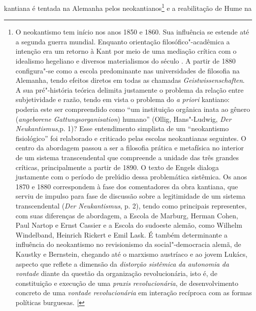 kantiana é tentada na Alemanha pelos neokantianos\footnote{O
  neokantismo tem início nos anos 1850 e 1860. Sua influência se estende
  até a segunda guerra mundial. Enquanto orientação filosófico"-acadêmica
  a intenção era um retorno à Kant por meio de uma mediação crítica com
  o idealismo hegeliano e diversos materialismos do século . A partir
  de 1880 configura"-se como a escola predominante nas universidades de
  filosofia na Alemanha, tendo efeitos diretos em todas as chamadas
  \emph{Geistwissenschaften}. A sua pré"-história teórica delimita
  justamente o problema da relação entre subjetividade e razão, tendo em
  vista o problema do \emph{a priori} kantiano: poderia este ser
  compreendido como ``um instituição orgânica inata ao gênero
  (\emph{angeborene Gattungsorganisation}) humano'' (Ollig, Hans"-Ludwig,
  \emph{Der Neukantismus},p. 1)? Esse entendimento simplista de um
  ``neokantismo fisiológico'' foi relaborado e criticado pelas escolas
  neokantianas seguintes. O centro da abordagem passou a ser a filosofia
  prática e metafísica no interior de um sistema transcendental que
  compreende a unidade das três grandes críticas, principalmente a
  partir de 1890. O texto de Engels dialoga justamente com o período de
  prelúdio dessa problemática sistêmica. Os anos 1870 e 1880
  correspondem à fase dos comentadores da obra kantiana, que serviu de
  impulso para fase de discussão sobre a legitimidade de um sistema
  transcendental (\emph{Der Neukantismus}, p. 2), tendo como principais
  representes, com suas diferenças de abordagem, a Escola de Marburg,
  Herman Cohen, Paul Nartop e Ernst Cassier e a Escola do sudoeste
  alemão, como Wilhelm Windelband, Heinrich Rickert e Emil Lask. É
  também determinante a influência do neokantismo no revisionismo da
  social"-democracia alemã, de Kaustky e Bernstein, chegando até o
  marxismo austríaco e ao jovem Lukács, aspecto que reflete a dimensão
  da \emph{distorção sistêmica} \emph{da autonomia da vontade} diante da
  questão da organização revolucionária, isto é, de constituição e
  execução de uma \emph{praxis revolucionária}, de desenvolvimento
  concreto de uma \emph{vontade revolucionária} em interação recíproca
  com as formas políticas burguesas. {[}\versal{N.\,T.}{]}} e a reabilitação de Hume na
